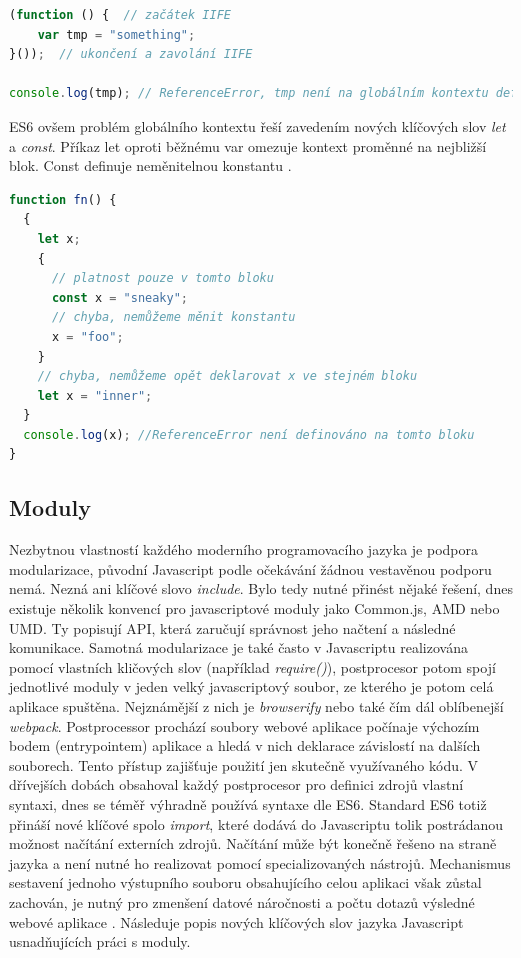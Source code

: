\begin{lstlisting}[language=Javascript,caption={IIFE – řešení lokálního kontextu v ES5 Javascriptu. \cite{exploring_es6}}]
(function () {  // začátek IIFE
    var tmp = "something";
}());  // ukončení a zavolání IIFE

console.log(tmp); // ReferenceError, tmp není na globálním kontextu definováno
\end{lstlisting}

ES6 ovšem problém globálního kontextu řeší zavedením nových klíčových slov \textit{let} a \textit{const}. Příkaz let oproti běžnému var omezuje kontext proměnné na nejbližší blok. Const definuje neměnitelnou konstantu \cite{exploring_es6} \cite{es6} \cite{es6_book}.
\begin{lstlisting}[language=Javascript,caption={Ukázka nových klíčových slov pro proměnné v ES6 Javascriptu \cite{exploring_es6}.}]
function fn() {
  {
    let x;
    {
      // platnost pouze v tomto bloku
      const x = "sneaky";
      // chyba, nemůžeme měnit konstantu
      x = "foo";
    }
    // chyba, nemůžeme opět deklarovat x ve stejném bloku
    let x = "inner";
  }
  console.log(x); //ReferenceError není definováno na tomto bloku
}
\end{lstlisting}
\subsection{Moduly}
Nezbytnou vlastností každého moderního programovacího jazyka je podpora modularizace, původní Javascript podle očekávání žádnou vestavěnou podporu nemá. Nezná ani klíčové slovo \textit{include}. Bylo tedy nutné přinést nějaké řešení, dnes existuje několik konvencí pro javascriptové moduly jako Common.js, AMD nebo UMD. Ty popisují API, která zaručují správnost jeho načtení a následné komunikace. Samotná modularizace je také často v Javascriptu realizována pomocí vlastních kličových slov (například \textit{require()}), postprocesor potom spojí jednotlivé moduly v jeden velký javascriptový soubor, ze kterého je potom celá aplikace spuštěna. Nejznámější z nich je \textit{browserify} nebo také čím dál oblíbenejší \textit{webpack}. Postprocessor prochází soubory webové aplikace počínaje výchozím bodem (entrypointem) aplikace a hledá v nich deklarace závislostí na dalších souborech. Tento přístup zajišťuje použití jen skutečně využívaného kódu. V dřívejších dobách obsahoval každý postprocesor pro definici zdrojů vlastní syntaxi, dnes se téměř výhradně používá syntaxe dle ES6. Standard ES6 totiž přináší nové klíčové spolo \textit{import}, které dodává do Javascriptu tolik postrádanou možnost načítání externích zdrojů. Načítání může být konečně řešeno na straně jazyka a není nutné ho realizovat pomocí specializovaných nástrojů. Mechanismus sestavení jednoho výstupního souboru obsahujícího celou aplikaci však zůstal zachován, je nutný pro zmenšení datové náročnosti a počtu dotazů výsledné webové aplikace \cite{exploring_es6} \cite{es6} \cite{es6_book}. Následuje popis nových klíčových slov jazyka Javascript usnadňujících práci s moduly.

